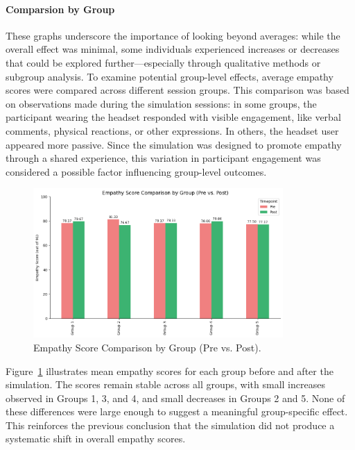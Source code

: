 \paragraph{Comparsion by Group}

These graphs underscore the importance of looking beyond averages: while the overall effect was minimal, some individuals experienced increases or decreases that could be explored further—especially through qualitative methods or subgroup analysis. To examine potential group-level effects, average empathy scores were compared across different session groups. This comparison was based on observations made during the simulation sessions: in some groups, the participant wearing the headset responded with visible engagement, like verbal comments, physical reactions, or other expressions. In others, the headset user appeared more passive. Since the simulation was designed to promote empathy through a shared experience, this variation in participant engagement was considered a possible factor influencing group-level outcomes.


\begin{figure}[htbp]
    \centering
    \includegraphics[width=0.85\textwidth]{../../Figures/emph-scores-comp-grp.png}
    \caption{Empathy Score Comparison by Group (Pre vs. Post).}
    \label{fig:empathy_group_bar}
\end{figure}

\vspace{1em}

Figure~\ref{fig:empathy_group_bar} illustrates mean empathy scores for each group before and after the simulation. The scores remain stable across all groups, with small increases observed in Groups 1, 3, and 4, and small decreases in Groups 2 and 5. None of these differences were large enough to suggest a meaningful group-specific effect. This reinforces the previous conclusion that the simulation did not produce a systematic shift in overall empathy scores.

